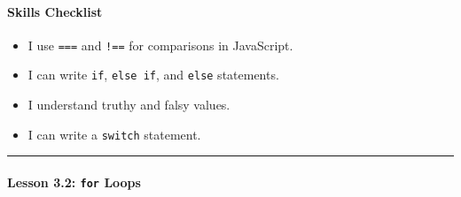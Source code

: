 \documentclass[
  justified,
  openright,
]{tufte-book}
\let\subsection\paragraph
\let\paragraph\paragraph
\let\subsection\paragraph
\let\paragraph\paragraph
\providecommand{\tightlist}{%
  \setlength{\itemsep}{0pt}\setlength{\parskip}{0pt}}
\begin{document}
\subsection{Skills Checklist}\label{skills-checklist-57}

\begin{itemize}
\tightlist
\item[$\square$]
  I use \texttt{===} and \texttt{!==} for comparisons in JavaScript.
\item[$\square$]
  I can write \texttt{if}, \texttt{else\ if}, and \texttt{else}
  statements.
\item[$\square$]
  I understand truthy and falsy values.
\item[$\square$]
  I can write a \texttt{switch} statement.
\end{itemize}

\begin{center}\rule{0.5\linewidth}{0.5pt}\end{center}

\subsection{\texorpdfstring{Lesson 3.2: \texttt{for}
Loops}{Lesson 3.2: for Loops}}\label{lesson-3.2-for-loops}
\end{document}
